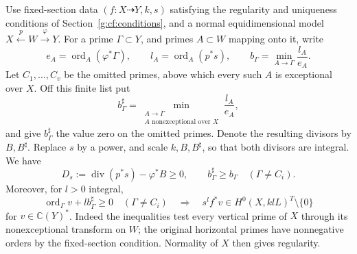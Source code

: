 Use fixed-section data \((f:X\dashrightarrow Y,k,s)\) satisfying
the regularity and uniqueness conditions of
Section~\ref{g:cf:conditions}, and a normal equidimensional model
\(X\xleftarrow pW\xrightarrow\varphi Y\).  For a prime
\(\Gamma\subset Y\), and primes \(A\subset W\) mapping onto it,
write
\[
 e_A=\operatorname{ord}_A(\varphi^*\Gamma),\qquad
 l_A=\operatorname{ord}_A(p^*s),\qquad
 b_\Gamma=\min_{A\to\Gamma}\frac{l_A}{e_A}.
\]
Let \(C_1,\ldots,C_v\) be the omitted primes, above which every
such \(A\) is exceptional over \(X\).  Off this finite list put
\[
 b^\sharp_\Gamma=
 \min_{\substack{A\to\Gamma\\A\text{ nonexceptional over }X}}
 \frac{l_A}{e_A},
\]
and give \(b^\sharp_\Gamma\) the value zero on the omitted primes.
Denote the resulting divisors by \(B,B^\sharp\).  Replace \(s\)
by a power, and scale \(k,B,B^\sharp\), so that both divisors are
integral.  We have
\begin{equation}\label{g:cf:parameter-model}
 D_s:=\operatorname{div}(p^*s)-\varphi^*B\geq0,
 \qquad b^\sharp_\Gamma\geq b_\Gamma
 \quad(\Gamma\ne C_i).
\end{equation}
Moreover, for \(l>0\) integral,
\begin{equation}\label{g:cf:parameter-lift}
 \operatorname{ord}_\Gamma v+l b^\sharp_\Gamma\geq0
 \quad(\Gamma\ne C_i)
 \quad\Longrightarrow\quad
 s^l f^*v\in H^0(X,klL)^T\setminus\{0\}
\end{equation}
for \(v\in\mathbb C(Y)^*\).  Indeed the inequalities test every
vertical prime of \(X\) through its nonexceptional transform on
\(W\); the original horizontal primes have nonnegative orders
by the fixed-section condition.  Normality of \(X\) then gives
regularity.

